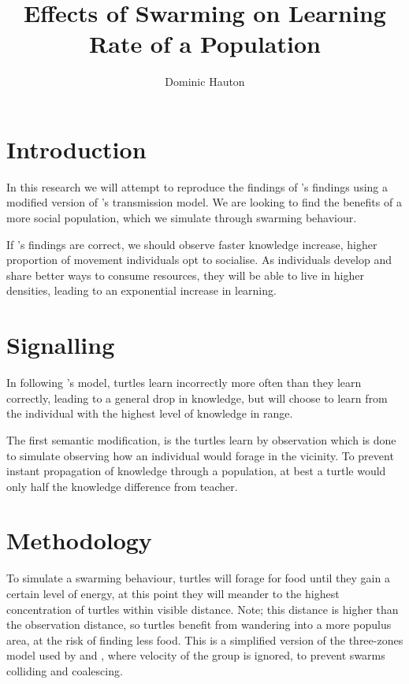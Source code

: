 \documentclass[a4paper,12pt,twocolumn]{report}
\title{Effects of Swarming on Learning Rate of a Population}
\author{Dominic Hauton}
\begin{document}
\maketitle


\section{Introduction}
In this research we will attempt to reproduce the findings of \cite{powell2009late}'s findings using a modified version of \cite{henrich2004demography}'s transmission model. We are looking to find the benefits of a more social population, which we simulate through swarming behaviour.

If \cite{powell2009late}'s findings are correct, we should observe faster knowledge increase, higher proportion of movement individuals opt to socialise. As individuals develop and share better ways to consume resources, they will be able to live in higher densities, leading to an exponential increase in learning.

\section{Signalling}
In following \cite{henrich2004demography}'s model, turtles learn incorrectly more often than they learn correctly, leading to a general drop in knowledge, but will choose to learn from the individual with the highest level of knowledge in range.

The first semantic modification, is the turtles learn by observation which is done to simulate observing how an individual would forage in the vicinity. To prevent instant propagation of knowledge through a population, at best a turtle would only half the knowledge difference from teacher.

\section{Methodology}
To simulate a swarming behaviour, turtles will forage for food until they gain a certain level of energy, at this point they will meander to the highest concentration of turtles within visible distance. Note; this distance is higher than the observation distance, so turtles benefit from wandering into a more populus area, at the risk of finding less food. This is a simplified version of the three-zones model used by \cite{1982simulation} and \cite{huth1992simulation}, where velocity of the group is ignored, to prevent swarms colliding and coalescing.
\end{document}
